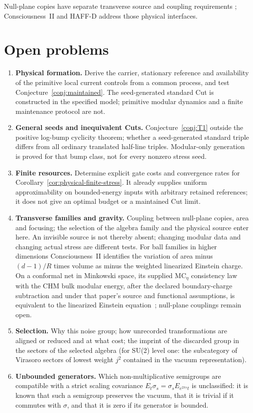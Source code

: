 \documentclass[12pt]{article}
\theoremstyle{definition}
\theoremstyle{remark}
\begin{document}
Null-plane copies have separate transverse source and coupling
requirements \cite{CTT,CF}; Consciousness~II and HAFF-D address
those physical interfaces.

\section{Open problems}\label{sec:open}
\begin{enumerate}[leftmargin=2em,itemsep=2pt]
\item \textbf{Physical formation.} Derive the carrier, stationary reference and
availability of the primitive local current controls from a common
process, and test
Conjecture~\ref{conj:maintained}. The seed-generated standard Cut is
constructed in the specified model; primitive modular dynamics and a finite
maintenance protocol are not.
\item \textbf{General seeds and inequivalent Cuts.}
Conjecture~\ref{conj:T1} outside the positive log-bump cyclicity theorem;
whether a seed-generated standard triple differs from all ordinary translated
half-line triples. Modular-only generation is proved for that bump class,
not for every nonzero stress seed.
\item \textbf{Finite resources.} Determine explicit gate costs and convergence
rates for Corollary~\ref{cor:physical-finite-stress}. It already supplies
uniform approximability on bounded-energy inputs with arbitrary retained
references; it does not give an optimal budget or a maintained Cut limit.
\item \textbf{Transverse families and gravity.} Coupling between null-plane copies,
area and focusing; the selection of the algebra family and the physical
source enter here. An invisible source is not thereby absent; changing modular
data and changing actual stress are different tests. For ball
families in higher dimensions Consciousness~II identifies the variation of area
minus $(d-1)/R$ times volume as minus the weighted linearized Einstein charge.
On a conformal net in Minkowski space, its supplied
$\mathrm{MC}_\eta$ consistency law with the CHM bulk modular energy,
after the declared boundary-charge subtraction and under that paper's
source and functional assumptions, is equivalent to the linearized
Einstein equation~\cite{PaperCII};
null-plane couplings remain open.
\item \textbf{Selection.} Why this noise group; how unrecorded transformations are
aligned or reduced and at what cost; the imprint of the discarded group in the
sectors of the selected algebra (for SU(2) level one: the subcategory of Virasoro
sectors of lowest weight \(j^2\) contained in the vacuum representation).
\item \textbf{Unbounded generators.} Which non-multiplicative semigroups are compatible
with a strict scaling covariance \(E_t\sigma_s=\sigma_sE_{e^{2\pi s}t}\) is unclassified: it
is known that such a semigroup preserves the vacuum, that it is trivial if it commutes
with \(\sigma\), and that it is zero if its generator is bounded.
\end{enumerate}
\end{document}
